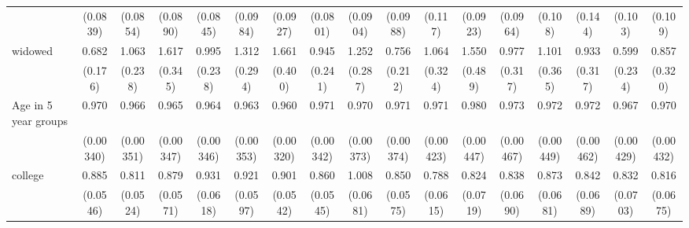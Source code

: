 {\begin{tabular}{l*{16}{c}}
                    &    (0.0839)         &    (0.0854)         &    (0.0890)         &    (0.0845)         &    (0.0984)         &    (0.0927)         &    (0.0801)         &    (0.0904)         &    (0.0988)         &     (0.117)         &    (0.0923)         &    (0.0964)         &     (0.108)         &     (0.144)         &     (0.103)         &     (0.109)         \\
[1em]
widowed             &       0.682         &       1.063         &       1.617\sym{*}  &       0.995         &       1.312         &       1.661\sym{*}  &       0.945         &       1.252         &       0.756         &       1.064         &       1.550         &       0.977         &       1.101         &       0.933         &       0.599         &       0.857         \\
                    &     (0.176)         &     (0.238)         &     (0.345)         &     (0.238)         &     (0.294)         &     (0.400)         &     (0.241)         &     (0.287)         &     (0.212)         &     (0.324)         &     (0.489)         &     (0.317)         &     (0.365)         &     (0.317)         &     (0.234)         &     (0.320)         \\
[1em]
Age in 5 year groups&       0.970\sym{***}&       0.966\sym{***}&       0.965\sym{***}&       0.964\sym{***}&       0.963\sym{***}&       0.960\sym{***}&       0.971\sym{***}&       0.970\sym{***}&       0.971\sym{***}&       0.971\sym{***}&       0.980\sym{***}&       0.973\sym{***}&       0.972\sym{***}&       0.972\sym{***}&       0.967\sym{***}&       0.970\sym{***}\\
                    &   (0.00340)         &   (0.00351)         &   (0.00347)         &   (0.00346)         &   (0.00353)         &   (0.00320)         &   (0.00342)         &   (0.00373)         &   (0.00374)         &   (0.00423)         &   (0.00447)         &   (0.00467)         &   (0.00449)         &   (0.00462)         &   (0.00429)         &   (0.00432)         \\
[1em]
college             &       0.885\sym{*}  &       0.811\sym{**} &       0.879\sym{*}  &       0.931         &       0.921         &       0.901         &       0.860\sym{*}  &       1.008         &       0.850\sym{*}  &       0.788\sym{**} &       0.824\sym{*}  &       0.838\sym{*}  &       0.873         &       0.842\sym{*}  &       0.832\sym{*}  &       0.816\sym{*}  \\
                    &    (0.0546)         &    (0.0524)         &    (0.0571)         &    (0.0618)         &    (0.0597)         &    (0.0542)         &    (0.0545)         &    (0.0681)         &    (0.0575)         &    (0.0615)         &    (0.0719)         &    (0.0690)         &    (0.0681)         &    (0.0689)         &    (0.0703)         &    (0.0675)         \\

\end{tabular}}
